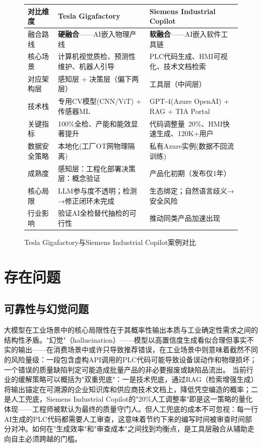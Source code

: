 \documentclass[12pt,a4paper]{ctexart}
\begin{document}
\begin{figure}[H]
\centering
\renewcommand{\arraystretch}{1.3}
\begin{tabular}{p{2.8cm} p{4.5cm} p{4.5cm}}
\hline
\rowcolor{gray!20}
\textbf{对比维度} & \textbf{Tesla Gigafactory} & \textbf{Siemens Industrial Copilot} \\
\hline
融合路线 & \textbf{硬融合}——AI嵌入物理产线 & \textbf{软融合}——AI嵌入软件工具链 \\
\hline
核心场景 & 计算机视觉质检、预测性维护、机器人引导 & PLC代码生成、HMI可视化、技术文档检索 \\
\hline
对应架构层 & 感知层 + 决策层（偏下两层）& 工具层（中间层）\\
\hline
技术栈 & 专用CV模型(CNN/ViT) + 传感器ML & GPT-4(Azure OpenAI) + RAG + TIA Portal \\
\hline
关键指标 & 100\%全检、产能和能效显著提升 & 代码调整量~20\%、HMI快速生成、120K+用户 \\
\hline
数据安全策略 & 本地化(工厂OT网物理隔离) & 私有Azure实例(数据不回流训练) \\
\hline
成熟度 & 感知层：工程化部署\newline 决策层：概念验证 & 产品化初期（发布仅1年）\\
\hline
核心局限 & LLM参与度不透明；检测→修正闭环未完成 & 生态绑定；自然语言歧义→安全风险 \\
\hline
行业影响 & 验证AI全检替代抽检的可行性 & 推动同类产品加速出现 \\
\hline
\end{tabular}
\caption{Tesla Gigafactory与Siemens Industrial Copilot案例对比}
\label{fig:case-comparison}
\end{figure}

\section{存在问题}

\subsection{可靠性与幻觉问题}

大模型在工业场景中的核心局限性在于其概率性输出本质与工业确定性需求之间的结构性矛盾。"幻觉"（hallucination）——模型以高置信度生成看似合理但事实不实的输出——在消费场景中或许只导致推荐错误，在工业场景中则意味着截然不同的风险量级：一段包含虚构API调用的PLC代码可能导致设备误动作和物理损坏；一个错误的质量缺陷判定可能造成批量产品的非必要报废或缺陷品流出。\cite{jms2025llmindustry5} 当前行业的缓解策略可以概括为"双重兜底"：一是技术兜底，通过RAG（检索增强生成）将输出锚定在可溯源的企业知识库和供应商技术文档上，降低凭空编造的概率；二是人工兜底，Siemens Industrial Copilot的"20\%人工调整率"即是这一策略的量化体现\cite{siemens2024xcelerator}——工程师被默认为最终的质量守门人。但人工兜底的成本不可忽视：每一行AI生成的PLC代码都需要人工审查，这意味着节约下来的编写时间被审查时间部分对冲。如何在"生成效率"和"审查成本"之间找到均衡点，是工具层融合从辅助走向自主必须跨越的门槛。
\end{document}
